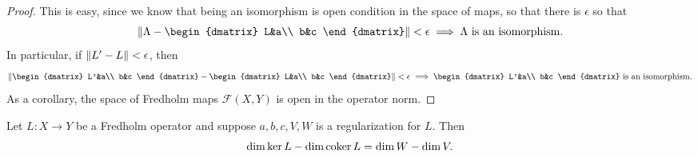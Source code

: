 \documentclass{amsart}
\begin{document}
 \begin{proof}
   This is easy, since we know that being an isomorphism is open
   condition in the space of maps, so that there is $\epsilon$ so that
   \begin{equation*}
     \norm{\Lambda-
       \begin{dmatrix}
         L&a\\
         b&c
       \end{dmatrix}
}<\epsilon\implies \Lambda\text{ is an isomorphism}.
\end{equation*}
In particular, if $\left\lVert L'-L\right\rVert<\epsilon$, then 
\begin{equation*}
  \norm{\begin{dmatrix}
         L'&a\\
         b&c
       \end{dmatrix}-\begin{dmatrix}
         L&a\\
         b&c
       \end{dmatrix}}<\epsilon\implies \begin{dmatrix}
         L'&a\\
         b&c
       \end{dmatrix}\text{ is an isomorphism}.
     \end{equation*}
     As a corollary, the space of Fredholm maps $\mathscr{F}(X,Y)$ is
     open in the operator norm.
   \end{proof}
   \begin{prop}
     Let $L:X\to Y$ be a Fredholm operator and suppose
     $a,b,c,V,W$ is a regularization for $L$. Then
     \begin{equation*}
       \dim \ker L-\dim \operatorname{\mathrm{coker}} L=\dim W-\dim V.
     \end{equation*}     
   \end{prop}
\end{document}
